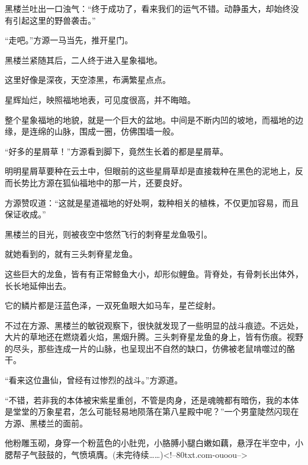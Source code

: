 \begin{this_body}
黑楼兰吐出一口浊气：“终于成功了，看来我们的运气不错。动静虽大，却始终没有引起这里的野兽袭击。”

“走吧。”方源一马当先，推开星门。

黑楼兰紧随其后，二人终于进入星象福地。

这里好像是深夜，天空漆黑，布满繁星点点。

星辉灿烂，映照福地地表，可见度很高，并不晦暗。

整个星象福地的地貌，就是一个巨大的盆地。中间是不断内凹的坡地，而福地的边缘，是连绵的山脉，围成一圈，仿佛围墙一般。

“好多的星屑草！”方源看到脚下，竟然生长着的都是星屑草。

明明星屑草要种在云土中，但眼前的这些星屑草却是直接栽种在黑色的泥地上，反而长势比方源在狐仙福地中的那一片，还要良好。

方源赞叹道：“这就是星道福地的好处啊，栽种相关的植株，不仅更加容易，而且保证收成。”

黑楼兰的目光，则被夜空中悠然飞行的刺脊星龙鱼吸引。

就她看到的，就有三头刺脊星龙鱼。

这些巨大的龙鱼，皆有有正常鲸鱼大小，却形似鲤鱼。背脊处，有骨刺长出体外，长长地延伸出去。

它的鳞片都是汪蓝色泽，一双死鱼眼大如马车，星芒绽射。

不过在方源、黑楼兰的敏锐观察下，很快就发现了一些明显的战斗痕迹。不远处，大片的草地还在燃烧着火焰，黑烟升腾。三头刺脊星龙鱼的身上，皆有伤痕。视野的尽头，那些连成一片的山脉，也呈现出不自然的缺口，仿佛被老鼠啃噬过的酪干。

“看来这位蛊仙，曾经有过惨烈的战斗。”方源道。

“不错，若非我的本体被宋紫星重创，不管是肉身，还是魂魄都有暗伤，我的本体是堂堂的万象星君，怎么可能轻易地陨落在第八星殿中呢？”一个男童陡然闪现在方源、黑楼兰的面前。

他粉雕玉砌，身穿一个粉蓝色的小肚兜，小胳膊小腿白嫩如藕，悬浮在半空中，小腮帮子气鼓鼓的，气愤填膺。(未完待续……)<!--80txt.com-ouoou-->

\end{this_body}

